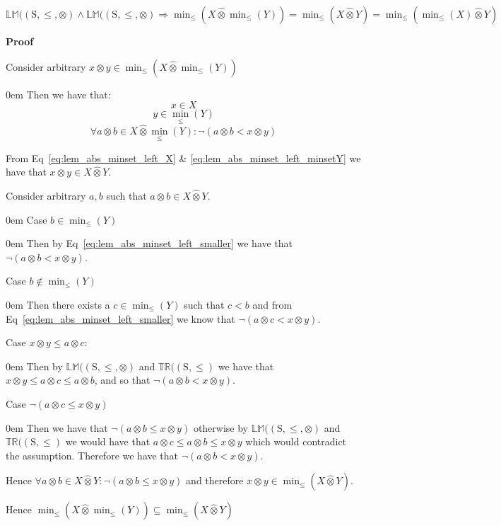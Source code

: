 \documentclass[10pt]{article}
\newcommand{\propname}[1]{{\mathbb{#1}}}
\newcommand{\lift}{\hat{\otimes}}
\newcommand{\proof}{\vspace{1em} \textbf{Proof} \vspace{1em}}
\newenvironment{ind}[0]{\begin{addmargin}[1em]{0em}\vspace{0.5em}}{\end{addmargin}\vspace{0.5em}}
\begin{document}
$\propname{LM}(\mathrm{(S,\leq,\otimes)} \wedge \propname{LM}(\mathrm{(S,\leq,\otimes)} \Rightarrow \min_\leq(X \lift \min_\leq(Y)) = \min_\leq(X \lift Y) = \min_\leq(\min_\leq(X) \lift Y)$

\proof

Consider arbitrary $x \otimes y \in \min_\leq(X \lift \min_\leq(Y))$

\begin{ind}
Then we have that:
\begin{equation} \label{eq:lem_abs_minset_left_X}
x \in X
\end{equation}
\begin{equation} \label{eq:lem_abs_minset_left_minsetY}
y \in \min_\leq(Y)
\end{equation}
\begin{equation} \label{eq:lem_abs_minset_left_smaller}
\forall a \otimes b \in X \lift \min_\leq(Y) : \neg (a \otimes b < x \otimes y)
\end{equation}

From Eq~\ref{eq:lem_abs_minset_left_X} \& \ref{eq:lem_abs_minset_left_minsetY} we have that $x \otimes y \in X \lift Y$.

\vspace{0.5em}

Consider arbitrary $a, b$ such that $a \otimes b \in X \lift Y$.
\begin{ind}
Case $b \in \min_\leq(Y)$
\begin{ind}
Then by Eq~\ref{eq:lem_abs_minset_left_smaller} we have that $\neg (a \otimes b < x \otimes y)$.
\end{ind}
Case $b \notin \min_\leq(Y)$
\begin{ind}
Then there exists a $c \in \min_\leq(Y)$ such that $c < b$ and from Eq~\ref{eq:lem_abs_minset_left_smaller} we know that $\neg (a \otimes c < x \otimes y)$.

\vspace{0.5em}

Case $x \otimes y \leq a \otimes c$:
\begin{ind}
Then by $\propname{LM}(\mathrm{(S,\leq,\otimes)}$ and $\propname{TR}(\mathrm{(S,\leq)}$ we have that $x \otimes y \leq a \otimes c \leq a \otimes b$, and so that $\neg (a \otimes b < x \otimes y)$.
\end{ind}
Case $\neg (a \otimes c \leq x \otimes y)$
\begin{ind}
Then we have that $\neg(a \otimes b \leq x \otimes y)$ otherwise by $\propname{LM}(\mathrm{(S,\leq,\otimes)}$ and $\propname{TR}(\mathrm{(S,\leq)}$ we would have that $a \otimes c \leq a \otimes b \leq x \otimes y$ which would contradict the assumption. Therefore we have that $\neg (a \otimes b < x \otimes y)$.
\end{ind}
\end{ind}
\end{ind}
Hence $\forall a \otimes b \in X \lift Y : \neg (a \otimes b \leq x \otimes y)$ and therefore $x \otimes y \in \min_\leq(X \lift Y)$.

\end{ind}
Hence $ \min_\leq(X \lift \min_\leq(Y)) \subseteq \min_\leq(X \lift Y)$
\end{document}
